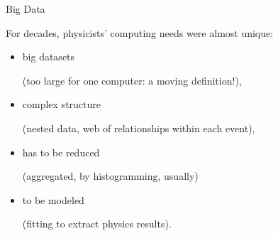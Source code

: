 \documentclass[aspectratio=169]{beamer}
\begin{document}
\begin{frame}{Big Data}
\vspace{0.5 cm}

\large For decades, physicists' computing needs were almost unique:

\vspace{0.1 cm}
\begin{itemize}
\item big datasets \hfill \begin{minipage}{0.7\linewidth}(too large for one computer: a moving definition!),\end{minipage}
\item complex structure \hfill \begin{minipage}{0.7\linewidth}(nested data, web of relationships within each event),\end{minipage}
\item has to be reduced \hfill \begin{minipage}{0.7\linewidth}(aggregated, by histogramming, usually)\end{minipage}
\item to be modeled \hfill \begin{minipage}{0.7\linewidth}(fitting to extract physics results).\end{minipage}
\end{itemize}

\vspace{0.5 cm}
\end{frame}
\end{document}
